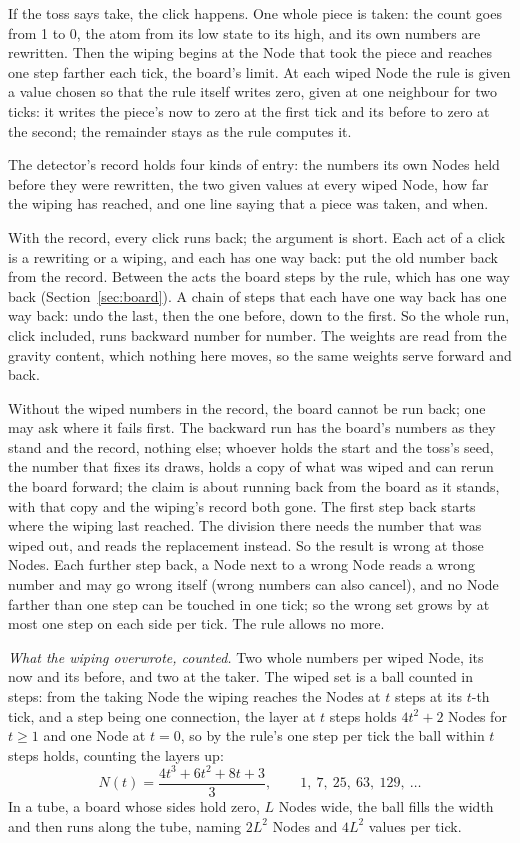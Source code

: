 \documentclass[pdflatex,sn-mathphys-num]{sn-jnl}
\begin{document}
If the toss says take, the click happens. One whole piece is taken: the count goes from 1 to 0, the atom from its low state to its high, and its own numbers are rewritten. Then the wiping begins at the Node that took the piece and reaches one step farther each tick, the board's limit. At each wiped Node the rule is given a value chosen so that the rule itself writes zero, given at one neighbour for two ticks: it writes the piece's now to zero at the first tick and its before to zero at the second; the remainder stays as the rule computes it.

The detector's record holds four kinds of entry: the numbers its own Nodes held before they were rewritten, the two given values at every wiped Node, how far the wiping has reached, and one line saying that a piece was taken, and when.

With the record, every click runs back; the argument is short. Each act of a click is a rewriting or a wiping, and each has one way back: put the old number back from the record. Between the acts the board steps by the rule, which has one way back (Section~\ref{sec:board}). A chain of steps that each have one way back has one way back: undo the last, then the one before, down to the first. So the whole run, click included, runs backward number for number. The weights are read from the gravity content, which nothing here moves, so the same weights serve forward and back.

Without the wiped numbers in the record, the board cannot be run back; one may ask where it fails first. The backward run has the board's numbers as they stand and the record, nothing else; whoever holds the start and the toss's seed, the number that fixes its draws, holds a copy of what was wiped and can rerun the board forward; the claim is about running back from the board as it stands, with that copy and the wiping's record both gone. The first step back starts where the wiping last reached. The division there needs the number that was wiped out, and reads the replacement instead. So the result is wrong at those Nodes. Each further step back, a Node next to a wrong Node reads a wrong number and may go wrong itself (wrong numbers can also cancel), and no Node farther than one step can be touched in one tick; so the wrong set grows by at most one step on each side per tick. The rule allows no more.

\textit{What the wiping overwrote, counted.} Two whole numbers per wiped Node, its now and its before, and two at the taker. The wiped set is a ball counted in steps: from the taking Node the wiping reaches the Nodes at $t$ steps at its $t$-th tick, and a step being one connection, the layer at $t$ steps holds $4t^2 + 2$ Nodes for $t \ge 1$ and one Node at $t = 0$, so by the rule's one step per tick the ball within $t$ steps holds, counting the layers up:
\begin{equation}\label{eq:ball}
N(t) = \frac{4t^3 + 6t^2 + 8t + 3}{3}, \qquad 1,\ 7,\ 25,\ 63,\ 129,\ \dots
\end{equation}
In a tube, a board whose sides hold zero, $L$ Nodes wide, the ball fills the width and then runs along the tube, naming $2L^2$ Nodes and $4L^2$ values per tick.
\end{document}
